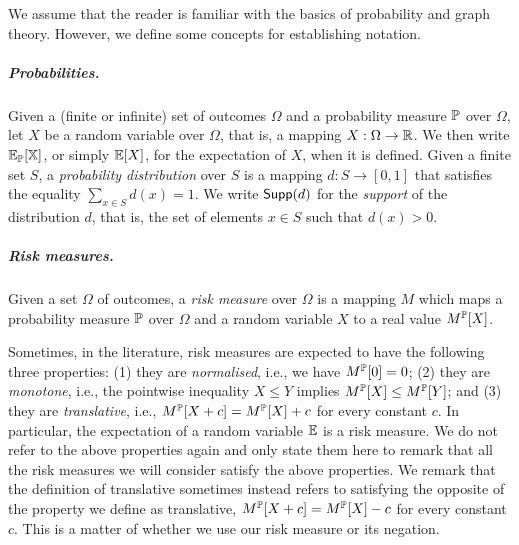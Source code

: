 We assume that the reader is familiar with the basics of probability and graph theory. However, we define some concepts for establishing notation. 

\subparagraph*{Probabilities.} Given a (finite or infinite) set of outcomes $\Omega$ and a probability measure $\mathbb{P}$ over $\Omega$, let $X$ be a random variable over $\Omega$, that is, a mapping $X: \Omega \to \mathbb{R}$. We then write $\mathbb{E}_{\mathbb{P}}[\mathbb{X}]$, or simply $\mathbb{E}[X]$, for the expectation of $X$, when it is defined.
Given a finite set $S$, a \emph{probability distribution} over $S$ is a mapping $d: S \to [0,1]$ that satisfies the equality $\sum_{x \in S} d(x) = 1$.
We write $\mathsf{Supp} (d)$ for the \emph{support} of the distribution $d$, that is, the set of elements $x \in S$ such that $d(x) > 0$.

\subparagraph{Risk measures.}
Given a set $\Omega$ of outcomes, a \emph{risk measure} over $\Omega$ is a mapping $M$ which maps a probability measure $\mathbb{P}$ over $\Omega$ and a random variable $X$ to a real value $M^{\mathbb{P}}[X]$.

Sometimes, in the literature, risk measures are expected to have the following three properties: (1) they are \emph{normalised}, i.e., we have $M^{\mathbb{P}}[0] = 0$; (2) they are  \emph{monotone}, i.e., the pointwise inequality $X \leq Y$ implies $M^{\mathbb{P}}[X] \leq M^{\mathbb{P}}[Y]$; and (3) they are \emph{translative}, i.e., $M^{\mathbb{P}}[X + c] = M^{\mathbb{P}}[X] + c$ for every constant $c$.
In particular, the expectation of a random variable $\mathbb{E}$ is a risk measure.
We do not refer to the above properties again and only state them here to remark that all the risk measures we will consider satisfy the above properties.
We remark that the definition of translative sometimes instead refers to satisfying the opposite of the property we define as translative, $M^{\mathbb{P}}[X + c] = M^{\mathbb{P}}[X] - c$ for every constant $c$. This is a matter of whether we use our risk measure or its negation.

